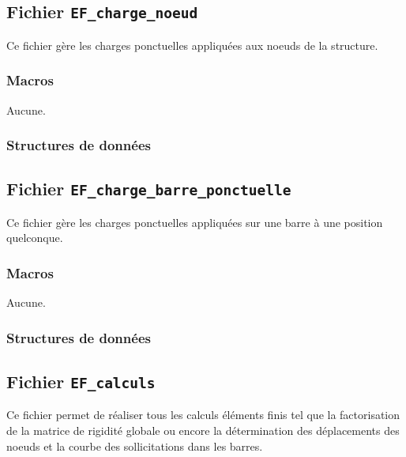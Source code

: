 \documentclass{article}
\begin{document}
\subsection{Fichier {\texttt{EF\_charge\_noeud}}}
Ce fichier gère les charges ponctuelles appliquées aux noeuds de la structure.
\subsubsection{Macros}
Aucune.
\subsubsection{Structures de données}



\subsection{Fichier {\texttt{EF\_charge\_barre\_ponctuelle}}}
Ce fichier gère les charges ponctuelles appliquées sur une barre à une position quelconque.
\subsubsection{Macros}
Aucune.
\subsubsection{Structures de données}

















\subsection{Fichier {\texttt{EF\_calculs}}}
Ce fichier permet de réaliser tous les calculs éléments finis tel que la factorisation de la matrice de rigidité globale ou encore la détermination des déplacements des noeuds et la courbe des sollicitations dans les barres.
\end{document}
